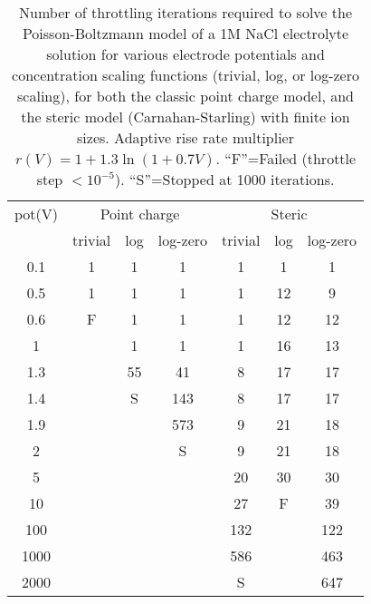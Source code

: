 \begin{table}
  \centering
  \begin{tabular}{c|ccc|ccc}
pot(V)  & \multicolumn{3}{c|}{Point charge} & \multicolumn{3}{c}{Steric}    \\
        & trivial & log & log-zero & trivial & log & log-zero \\ \hline
0.1	&1	&1	&1	&1	&1	&1\\
0.5	&1	&1	&1	&1	&12	&9\\
0.6	&F	&1	&1	&1	&12	&12\\
1	&	&1	&1	&1	&16	&13\\
1.3	&	&55	&41	&8	&17	&17\\
1.4	&	&S	&143	&8	&17	&17\\
1.9	&	&	&573	&9	&21	&18\\
2	&	&	&S	&9	&21	&18\\
5	&	&	&	&20	&30	&30\\
10	&	&	&	&27	&F	&39\\
100	&	&	&	&132	&	&122\\
1000	&	&	&	&586	&	&463    \\
2000	&	&	&	&S	&	&647    
  \end{tabular}
\caption{\label{tab:convergence}Number of throttling iterations
  required to  solve the  Poisson-Boltzmann model of a 1M NaCl electrolyte solution
  for various electrode potentials and concentration scaling
  functions (trivial, log, or log-zero scaling), for both the classic point charge model, and the steric
  model (Carnahan-Starling) with finite ion sizes. Adaptive rise rate
  multiplier $r(V)=1+1.3\ln(1+0.7V)$.
  ``F''=Failed
  (throttle step $<10^{-5}$). ``S''=Stopped at 1000 iterations.}
\end{table}


